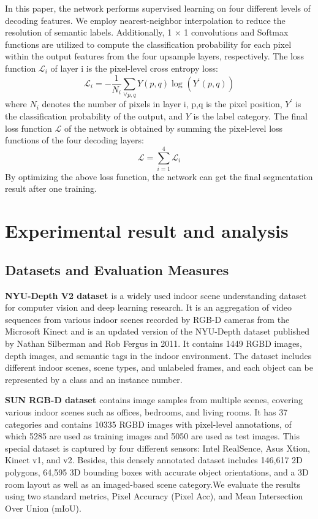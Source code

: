 \documentclass{aims}
\numberwithin{equation}{section}
\begin{document}
In this paper, the network performs supervised learning on four different levels of decoding features. We employ nearest-neighbor interpolation to reduce the resolution of semantic labels.  Additionally, 1 $\times$ 1 convolutions and Softmax functions are utilized to compute the classification probability for each pixel within the output features from the four upsample layers, respectively. The loss function $\mathcal{L}_{i}$ of layer i is the pixel-level cross entropy loss: 
\begin{equation}
    \mathcal{L}_{i} = -\frac{1}{{N}_{i}}\displaystyle\sum_{\forall p,q}Y(p,q)\log_{}{({Y}^{\prime}(p,q))}
\end{equation}
where ${N}_{i}$ denotes the number of pixels in layer i, p,q is the pixel position, ${Y}^{\prime}$ is the classification probability of the output, and $Y$ is the label category. The final loss function $\mathcal {L}$ of the network is obtained by summing the pixel-level loss functions of the four decoding layers:
\begin{equation}
    \mathcal{L}= \displaystyle\sum_{i=1}^{4}\mathcal{L}_{i}
\end{equation}
By optimizing the above loss function, the network can get the final segmentation result after one training.

\section{Experimental result and analysis}

\subsection{Datasets and Evaluation Measures}
{\bfseries NYU-Depth V2 dataset \cite{silberman2012indoor}} is a widely used indoor scene understanding dataset for computer vision and deep learning research. It is an aggregation of video sequences from various indoor scenes recorded by RGB-D cameras from the Microsoft Kinect and is an updated version of the NYU-Depth dataset published by Nathan Silberman and Rob Fergus in 2011. It contains 1449 RGBD images, depth images, and semantic tags in the indoor environment. The dataset includes different indoor scenes, scene types, and unlabeled frames, and each object can be represented by a class and an instance number.

{\bfseries SUN RGB-D dataset \cite{song2015sun}} contains image samples from multiple scenes, covering various indoor scenes such as offices, bedrooms, and living rooms. It has 37 categories and contains 10335 RGBD images with pixel-level annotations, of which 5285 are used as training images and 5050 are used as test images. This special dataset is captured by four different sensors: Intel RealSence, Asus Xtion, Kinect v1, and v2. Besides, this densely annotated dataset includes 146,617 2D polygons, 64,595 3D bounding boxes with accurate object orientations, and a 3D room layout as well as an imaged-based scene category.We evaluate the results using two standard metrics, Pixel Accuracy (Pixel Acc), and Mean Intersection Over Union (mIoU).
\end{document}
